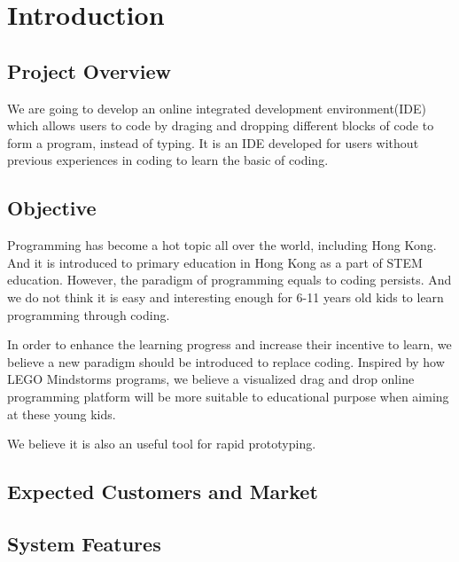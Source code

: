 \documentclass[CSCI3100_Documentation]{subfiles}
\begin{document}
  \section{Introduction}
  \subsection{Project Overview}
  We are going to develop an online integrated development environment(IDE) which allows users to code by draging and dropping different blocks of code to form a program, instead of typing. It is an IDE developed for users without previous experiences in coding to learn the basic of coding.
  \subsection{Objective}
  Programming has become a hot topic all over the world, including Hong Kong. And it is introduced to primary education in Hong Kong as a part of STEM education. However, the paradigm of programming equals to coding persists. And we do not think it is easy and interesting enough for 6-11 years old kids to learn programming through coding.

  In order to enhance the learning progress and increase their incentive to learn, we believe a new paradigm should be introduced to replace coding. Inspired by how LEGO\textsuperscript{\textregistered} Mindstorms\textsuperscript{\textregistered} programs, we believe a visualized drag and drop online programming platform will be more suitable to educational purpose when aiming at these young kids.

  We believe it is also an useful tool for rapid prototyping.
  \subsection{Expected Customers and Market}
  \subsection{System Features}
\end{document}
